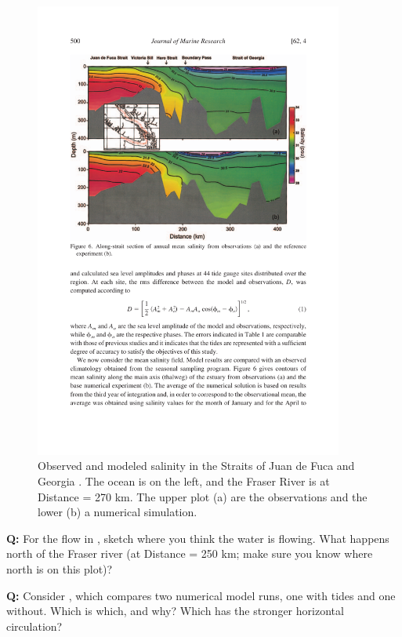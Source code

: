 \begin{figure}[htb]
  \centering
  \includegraphics[width=4in]{figs/MassonCummins04Fig6}
  \caption{Observed and modeled salinity in the Straits of Juan de
    Fuca and Georgia \citep{massoncummins04}. The ocean is on the left, and the Fraser River is at Distance = 270 km. The upper plot (a) are the observations and the lower (b) a numerical simulation. }
  \label{fig:MassonCummins04Fig6}
\end{figure}

{\bf Q:}  For the flow in , sketch where you think the water is flowing.  What happens north of the Fraser river (at Distance = 250 km; make sure you know where north is on this plot)?

{\bf Q:} Consider , which compares two numerical model runs, one with tides and one without.  Which is which, and why?  Which has the stronger horizontal circulation?

